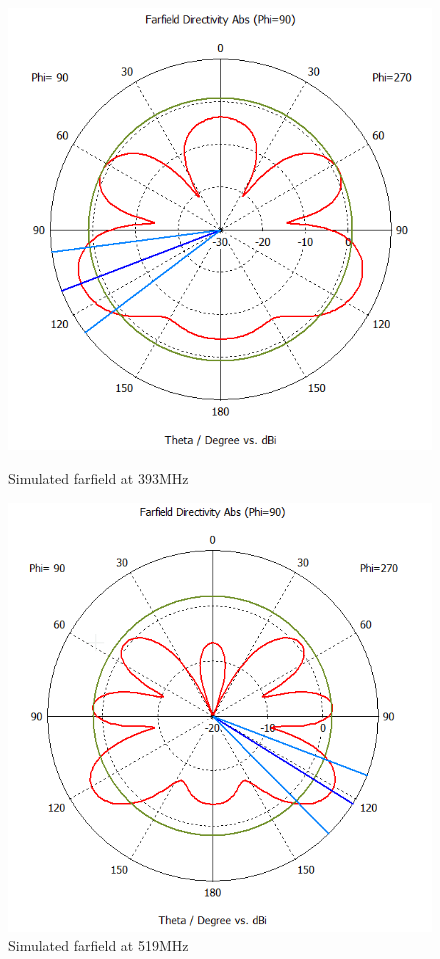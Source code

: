 \begin{figure}[H]
  \centering
  \begin{minipage}[b]{0.5\textwidth}
	\includegraphics[scale = 0.5]{figures/antennas/qha/qha_6_ff_393}
	\caption{Simulated farfield at 393MHz}
    \label{fig:WB_QHA}
  \end{minipage}
  \hfill
  \begin{minipage}[b]{0.4\textwidth}
\includegraphics[scale = 0.5]{figures/antennas/qha/qha_6_ff_519}
\caption{Simulated farfield at 519MHz}
    \label{fig:WB_QHA_feed}
  \end{minipage}
\end{figure}


